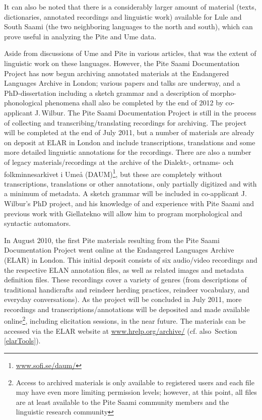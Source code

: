 \documentclass[a4paper,12pt]{article}
\begin{document}
It can also be noted that there is a considerably larger amount of material (texts, dictionaries, annotated recordings and linguistic work)  available for Lule and South Saami (the two neighboring languages to the north and south), which can prove useful in analyzing the Pite and Ume data.

Aside from discussions of Ume and Pite in various articles, that was the extent of linguistic work on these languages. However, the Pite Saami Documentation Project has now begun archiving annotated materials at the Endangered Languages Archive in London; various papers and talks are underway, and a PhD-dissertation including a sketch grammar and a description of morpho-phonological phenomena shall also be completed by the end of 2012 by co-applicant J.\,Wilbur. The Pite Saami Documentation Project is still in the process of collecting and transcribing/translating recordings for archiving. The project will be completed at the end of July 2011, but a number of materials are already on deposit at ELAR in London and include transcriptions, translations and some more detailed linguistic annotations for the recordings. There are also a number of legacy materials/recordings at the archive of the Dialekt-, ortnams- och folkminnesarkivet i Umeå (DAUM)\footnote{\url{www.sofi.se/daum/}}, but these are completely without transcriptions, translations or other annotations, only partially digitized and with a minimum of metadata. A sketch grammar will be included in co-applicant J.\,Wilbur's PhD project, and his knowledge of and experience with Pite Saami and previous work with Giellatekno will allow him to program morphological and syntactic automators.

In August 2010, the first Pite materials resulting from the Pite Saami Documentation Project went online at the Endangered Languages Archive (ELAR) in London. This initial deposit consists of six audio/video recordings and the respective ELAN annotation files, as well as related images and metadata definition files. These recordings cover a variety of genres (from descriptions of traditional handicrafts and reindeer herding practices, reindeer vocabulary, and everyday conversations). As the project will be concluded in July 2011, more recordings and transcriptions/annotations will be deposited and made available online\footnote{Access to archived materials is only available to registered users and each file may have even more limiting permission levels; however, at this point, all files are at least available to the Pite Saami community members and the linguistic research community}, including elicitation sessions, in the near future. The materials can be accessed via the ELAR website at \url{www.hrelp.org/archive/} (cf. also~Section \ref{elarTools}).
\end{document}

